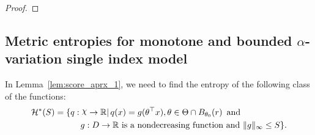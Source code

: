 {\begin{proof}

\end{proof}

\subsection{Metric entropies for  monotone and bounded $\alpha$-variation single index model}
In Lemma~\ref{lem:score_aprx_1}, we need to find the entropy of the following class of the functions:
\begin{align}\label{LIP:w_def}
\begin{split}
\mathcal{H}^*(S)&=\{q:\rchi\to\R|\, q(x)=g(\theta^\top x),  \theta\in \Theta\cap B_{\theta_0}(r)\, \text{ and }\\ &\qquad \quad g:D\to \R \text{ is a nondecreasing function and }  \|g\|_\infty \le S \}.\\
\end{split}
\end{align}


}

